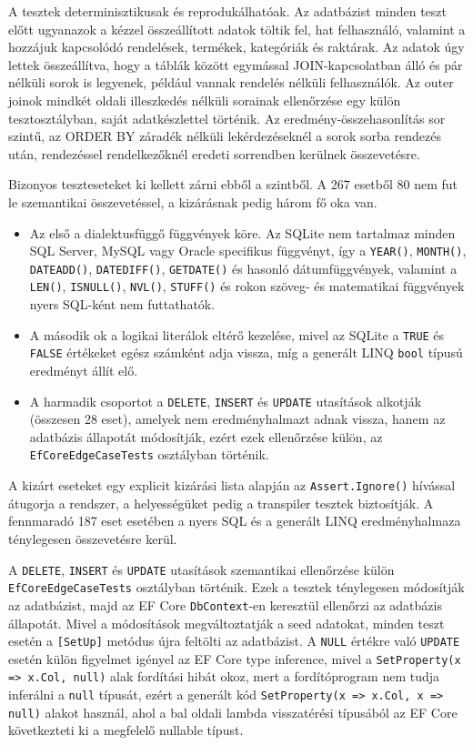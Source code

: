 A tesztek determinisztikusak és reprodukálhatóak. Az adatbázist minden teszt előtt ugyanazok a kézzel összeállított adatok töltik fel, hat felhasználó, valamint a hozzájuk kapcsolódó rendelések, termékek, kategóriák és raktárak. Az adatok úgy lettek összeállítva, hogy a táblák között egymással JOIN-kapcsolatban álló és pár nélküli sorok is legyenek, például vannak rendelés nélküli felhasználók. Az outer joinok mindkét oldali illeszkedés nélküli sorainak ellenőrzése egy külön tesztosztályban, saját adatkészlettel történik. Az eredmény-összehasonlítás sor szintű, az ORDER BY záradék nélküli lekérdezéseknél a sorok sorba rendezés után, rendezéssel rendelkezőknél eredeti sorrendben kerülnek összevetésre.

Bizonyos teszteseteket ki kellett zárni ebből a szintből. A 267 esetből 80 nem fut le szemantikai összevetéssel, a kizárásnak pedig három fő oka van.

\begin{itemize}
	\item Az első a dialektusfüggő függvények köre. Az SQLite nem tartalmaz minden SQL Server, MySQL vagy Oracle specifikus függvényt, így a \texttt{YEAR()}, \texttt{MONTH()}, \texttt{DATEADD()}, \texttt{DATEDIFF()}, \texttt{GETDATE()} és hasonló dátumfüggvények, valamint a \texttt{LEN()}, \texttt{ISNULL()}, \texttt{NVL()}, \texttt{STUFF()} és rokon szöveg- és matematikai függvények nyers SQL-ként nem futtathatók.
	\item A második ok a logikai literálok eltérő kezelése, mivel az SQLite a \texttt{TRUE} és \texttt{FALSE} értékeket egész számként adja vissza, míg a generált LINQ \texttt{bool} típusú eredményt állít elő.
	\item A harmadik csoportot a \texttt{DELETE}, \texttt{INSERT} és \texttt{UPDATE} utasítások alkotják (összesen 28 eset), amelyek nem eredményhalmazt adnak vissza, hanem az adatbázis állapotát módosítják, ezért ezek ellenőrzése külön, az \texttt{EfCoreEdgeCaseTests} osztályban történik.
\end{itemize}

A kizárt eseteket egy explicit kizárási lista alapján az \texttt{Assert.Ignore()} hívással átugorja a rendszer, a helyességüket pedig a transpiler tesztek biztosítják. A fennmaradó 187 eset esetében a nyers SQL és a generált LINQ eredményhalmaza ténylegesen összevetésre kerül.

A \texttt{DELETE}, \texttt{INSERT} és \texttt{UPDATE} utasítások szemantikai ellenőrzése külön \\ \texttt{EfCoreEdgeCaseTests} osztályban történik. Ezek a tesztek ténylegesen módosítják az adatbázist, majd az EF Core \texttt{DbContext}-en keresztül ellenőrzi az adatbázis állapotát. Mivel a módosítások megváltoztatják a seed adatokat, minden teszt esetén a \texttt{[SetUp]} metódus újra feltölti az adatbázist. A \texttt{NULL} értékre való \texttt{UPDATE} esetén külön figyelmet igényel az EF Core type inference, mivel a \texttt{SetProperty(x => x.Col, null)} alak fordítási hibát okoz, mert a fordítóprogram nem tudja inferálni a \texttt{null} típusát, ezért a generált kód \texttt{SetProperty(x => x.Col, x => null)} alakot használ, ahol a bal oldali lambda visszatérési típusából az EF Core következteti ki a megfelelő nullable típust.

